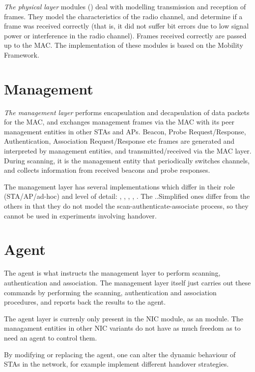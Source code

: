 \textit{The physical layer} modules () deal with modelling
transmission and reception of frames. They model the characteristics of
the radio channel, and determine if a frame was received correctly
(that is, it did not suffer bit errors due to low signal power or
interference in the radio channel). Frames received correctly are passed
up to the MAC. The implementation of these modules is based on the
Mobility Framework.

\section{Management}

\textit{The management layer} performs encapsulation and decapsulation of data packets
for the MAC, and exchanges management frames via the MAC with its peer
management entities in other STAs and APs. Beacon, Probe Request/Response,
Authentication, Association Request/Response etc frames are generated
and interpreted by management entities, and transmitted/received via
the MAC layer. During scanning, it is the management entity that periodically
switches channels, and collects information from received beacons and
probe responses.

The management layer has several implementations which differ in their role
(STA/AP/ad-hoc) and level of detail: ,
, , ,
. The ..Simplified ones differ from the others
in that they do not model the scan-authenticate-associate process,
so they cannot be used in experiments involving handover.

\section{Agent}

The agent is what instructs the management layer to perform
scanning, authentication and association. The management layer itself
just carries out these commands by performing the scanning, authentication
and association procedures, and reports back the results to the agent.

The agent layer is currenly only present in the  NIC module,
as an  module. The managament entities in other NIC
variants do not have as much freedom as to need an agent to control them.

By modifying or replacing the agent, one can alter the dynamic behaviour
of STAs in the network, for example implement different handover strategies.




